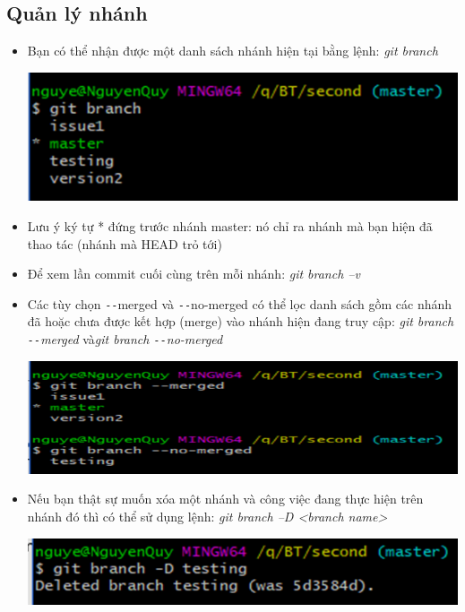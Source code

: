 \documentclass[12pt,a4paper]{report}
\begin{document}
\subsection{Quản lý nhánh}
\begin{itemize}
\item Bạn có thể nhận được một danh sách nhánh hiện tại bằng lệnh: {\it git branch}

	\includegraphics[width=0.8\linewidth]{screenshot055}
	
	\label{fig:screenshot055}

\item Lưu ý ký tự * đứng trước nhánh master: nó chỉ ra nhánh mà bạn hiện đã thao tác (nhánh mà HEAD trỏ tới)
\item Để xem lần commit cuối cùng trên mỗi nhánh: {\it git branch –v}
\item Các tùy chọn \texttt{-{}-}merged và \texttt{-{}-}no-merged có thể lọc danh sách gồm các nhánh đã hoặc chưa được kết hợp (merge) vào nhánh hiện đang truy cập: {\it git branch \texttt{-{}-}merged} và{\it git branch \texttt{-{}-}no-merged}

	\includegraphics[width=0.8\linewidth]{screenshot056}

	\label{fig:screenshot056}

\item Nếu bạn thật sự muốn xóa một nhánh và công việc đang thực hiện trên nhánh đó thì có thể sử dụng lệnh: {\it git branch –D <branch name>}

	\includegraphics[width=0.8\linewidth]{screenshot057}

	\label{fig:screenshot057}

\end{itemize}
\end{document}

